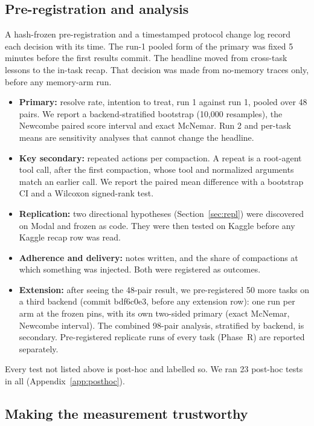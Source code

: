 \documentclass[11pt]{article}
\begin{document}
\subsection{Pre-registration and analysis}
A hash-frozen pre-registration and a timestamped protocol change log record each decision with its
time. The run-1 pooled form of the primary was fixed 5 minutes before the first results commit. The headline moved from cross-task lessons to the in-task recap. That
decision was made from no-memory traces only, before any memory-arm run.
\begin{itemize}
\item \textbf{Primary:} resolve rate, intention to treat, run 1 against run 1, pooled over 48 pairs.
  We report a backend-stratified bootstrap (10,000 resamples), the Newcombe paired score interval
  and exact McNemar. Run 2 and per-task means are sensitivity analyses that cannot change the
  headline.
\item \textbf{Key secondary:} repeated actions per compaction. A repeat is a root-agent tool call,
  after the first compaction, whose tool and normalized arguments match an earlier call. We report
  the paired mean difference with a bootstrap CI and a Wilcoxon signed-rank test.
\item \textbf{Replication:} two directional hypotheses (Section~\ref{sec:repl}) were discovered on
  Modal and frozen as code. They were then tested on Kaggle before any Kaggle recap row was read.
\item \textbf{Adherence and delivery:} notes written, and the share of compactions at which something
  was injected. Both were registered as outcomes.
\item \textbf{Extension:} after seeing the 48-pair result, we pre-registered 50 more tasks on a third
  backend (commit bdf6c0e3, before any extension row): one run per arm at the frozen pins, with its
  own two-sided primary (exact McNemar, Newcombe interval). The combined 98-pair analysis,
  stratified by backend, is secondary. Pre-registered replicate runs of every task (Phase~R) are reported separately.
\end{itemize}
Every test not listed above is post-hoc and labelled so. We ran 23 post-hoc tests in all
(Appendix~\ref{app:posthoc}).

\subsection{Making the measurement trustworthy}\label{sec:trust}
\end{document}
